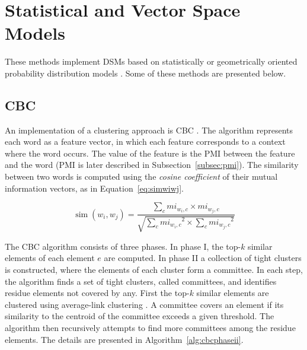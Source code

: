\section{Statistical and Vector Space Models}
\label{sec:vectorspace}

These methods implement \acp{DSM} based on statistically or geometrically  
oriented probability distribution models \citep{van2010mining}. Some of these 
methods are presented below.

\subsection{\acl*{CBC}}

An implementation of a clustering approach is \ac{CBC} 
\citep{pantel2003clustering}. The algorithm represents each word as a feature 
vector, in which each feature corresponds to a context where the word occurs. 
The value of the feature is the \ac{PMI} between the feature and the word 
\citep{bouma2009normalized} (\ac{PMI} is later described in 
Subsection~\ref{subsec:pmi}). The similarity between two words is computed 
using the \textit{cosine coefficient} \citep{salton1986introduction} of their 
mutual information vectors, as in Equation~\ref{eq:simwiwj}.

\begin{equation}
\operatorname{sim}(w_i,w_j) = \frac{\sum_c mi_{w_i,c} \times mi_{w_j,c}}
                    {\sqrt{\sum_c{mi_{w_i,c}}^2 \times \sum_c{mi_{w_j,c}}^2}}
\label{eq:simwiwj}
\end{equation}

The \ac{CBC} algorithm consists of three phases. In phase I, the top-$k$ 
similar elements of each element $e$ are computed. In phase II a collection of 
tight clusters is constructed, where the elements of each cluster form a 
committee. In each step, the algorithm finds a set of tight clusters, called 
committees, and identifies residue elements not covered by any. First the 
top-$k$ similar elements are clustered using average-link clustering 
\citep{han2000data}. A committee covers an element if its similarity to the 
centroid of the committee exceeds a given threshold. The algorithm then 
recursively attempts to find more committees among the residue elements. The 
details are presented in Algorithm~\ref{alg:cbcphaseii}.


